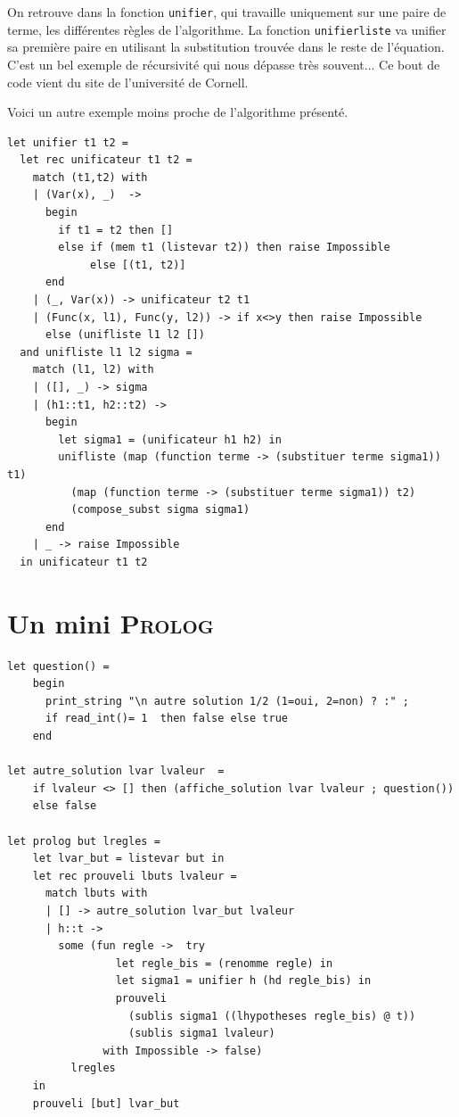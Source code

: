 On retrouve dans la fonction \texttt{unifier}, qui travaille uniquement sur une paire de terme, les différentes règles
de l'algorithme. La fonction \texttt{unifierliste} va unifier sa première paire en utilisant la substitution trouvée dans le reste
de l'équation. C'est un bel exemple de récursivité qui nous dépasse très souvent... 
Ce bout de code vient du site de l'université de Cornell.

Voici un autre exemple moins proche de l'algorithme présenté.
\begin{verbatim}
let unifier t1 t2 =
  let rec unificateur t1 t2 =
    match (t1,t2) with
    | (Var(x), _)  -> 
      begin
        if t1 = t2 then [] 
        else if (mem t1 (listevar t2)) then raise Impossible
             else [(t1, t2)]
      end		  
    | (_, Var(x)) -> unificateur t2 t1
    | (Func(x, l1), Func(y, l2)) -> if x<>y then raise Impossible
      else (unifliste l1 l2 [])
  and unifliste l1 l2 sigma =
    match (l1, l2) with
    | ([], _) -> sigma
    | (h1::t1, h2::t2) ->
      begin
        let sigma1 = (unificateur h1 h2) in
        unifliste (map (function terme -> (substituer terme sigma1)) t1)
          (map (function terme -> (substituer terme sigma1)) t2)
          (compose_subst sigma sigma1)
      end		
    | _ -> raise Impossible
  in unificateur t1 t2 
\end{verbatim}


\section{Un mini \textsc{Prolog}}
\begin{verbatim}
let question() =
	begin
	  print_string "\n autre solution 1/2 (1=oui, 2=non) ? :" ;
	  if read_int()= 1  then false else true 
	end
  
let autre_solution lvar lvaleur  =
	if lvaleur <> [] then (affiche_solution lvar lvaleur ; question())
	else false 
  
let prolog but lregles =
	let lvar_but = listevar but in
	let rec prouveli lbuts lvaleur =
	  match lbuts with
	  | [] -> autre_solution lvar_but lvaleur
	  | h::t -> 
		some (fun regle ->  try
				 let regle_bis = (renomme regle) in
				 let sigma1 = unifier h (hd regle_bis) in			
				 prouveli 
				   (sublis sigma1 ((lhypotheses regle_bis) @ t))
				   (sublis sigma1 lvaleur)  
			   with Impossible -> false)
		  lregles 
	in
	prouveli [but] lvar_but
  
\end{verbatim}

